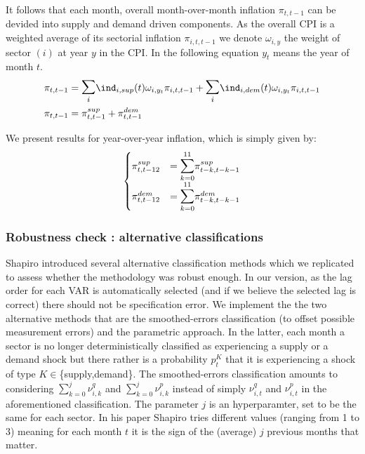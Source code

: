 It follows that each month, overall month-over-month inflation $\pi_{t,t-1}$ can be devided into supply and demand driven components. 
As the overall CPI is a weighted average of its sectorial inflation $\pi_{i,t,t-1}$ we denote $\omega_{i,y}$ the weight of sector $(i)$ at year $y$ in the CPI.
In the following equation $y_t$ means the year of month $t$.
\begin{align*}
    \pi_{t,t-1} &= \mathlarger{\mathlarger{\sum}}_{i} \ind_{i,sup}(t) \omega_{i,y_t} \pi_{i,t,t-1} + \mathlarger{\mathlarger{\sum}}_{i} \ind_{i,dem}(t) \omega_{i,y_t} \pi_{i,t,t-1} \\
    \pi_{t,t-1} &= \pi_{t,t-1}^{sup} + \pi_{t,t-1}^{dem}
\end{align*}

We present results for year-over-year inflation, which is simply given by:
\begin{align*}
    \begin{cases}
        \pi_{t,t-12}^{sup} &= \mathlarger{\mathlarger{\sum}}_{k=0}^{11} \pi_{t-k,t-k-1}^{sup} \\
        \pi_{t,t-12}^{dem} &= \mathlarger{\mathlarger{\sum}}_{k=0}^{11} \pi_{t-k,t-k-1}^{dem}
    \end{cases}
\end{align*}

\subsubsection{Robustness check : alternative classifications}

\quad Shapiro introduced several alternative classification methods which we replicated to assess whether the methodology was robust enough.
In our version, as the lag order for each VAR is automatically selected (and if we believe the selected lag is correct) there should not be specification error.
\bigbreak
We implement the the two alternative methods that are the smoothed-errors classification (to offset possible measurement errors) and the parametric approach. 
In the latter, each month a sector is no longer deterministically classified as experiencing a supply or a demand shock but there rather is a probability $p_t^K$ that it is experiencing a shock of type $K \in$\{supply,demand\}.
\bigbreak
The smoothed-errors classification amounts to considering $\sum_{k=0}^{j} \nu_{i,k}^{q}$ and $\sum_{k=0}^{j} \nu_{i,k}^{p}$ instead of simply $\nu_{i,t}^{q}$ and $\nu_{i,t}^{p}$ in the aforementioned classification. 
The parameter $j$ is an hyperparamter, set to be the same for each sector. In his paper Shapiro tries different values (ranging from 1 to 3) meaning for each month $t$ it is the sign of the (average) $j$ previous months that matter.


